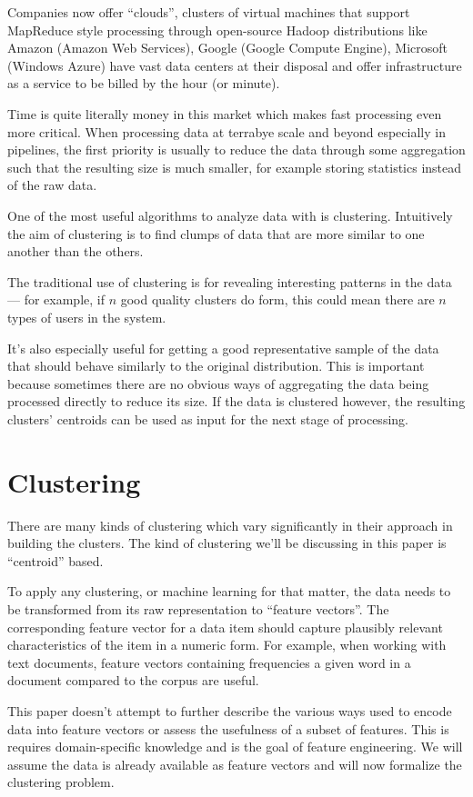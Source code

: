 \documentclass{article}
\begin{document}
Companies now offer ``clouds'', clusters of virtual machines that support
MapReduce style processing through open-source Hadoop distributions like Amazon
(Amazon Web Services), Google (Google Compute Engine), Microsoft (Windows
Azure) have vast data centers at their disposal and offer infrastructure as a
service to be billed by the hour (or minute).

Time is quite literally money in this market which makes fast processing even
more critical. When processing data at terrabye scale and beyond especially in
pipelines, the first priority is usually to reduce the data through some
aggregation such that the resulting size is much smaller, for example storing
statistics instead of the raw data.

One of the most useful algorithms to analyze data with is clustering.
Intuitively the aim of clustering is to find clumps of data that are more
similar to one another than the others.

The traditional use of clustering is for revealing interesting patterns in the
data --- for example, if $n$ good quality clusters do form, this could mean there
are $n$ types of users in the system.

It's also especially useful for getting a good representative sample of the data
that should behave similarly to the original distribution.
This is important because sometimes there are no obvious ways of aggregating the 
data being processed directly to reduce its size. If the data is clustered
however, the resulting clusters' centroids can be used as input for the next
stage of processing.

\section{Clustering}

There are many kinds of clustering which vary significantly in their approach
in building the clusters. The kind of clustering we'll be discussing in this
paper is ``centroid'' based.

To apply any clustering, or machine learning for that matter, the data needs to
be transformed from its raw representation to ``feature vectors''. The
corresponding feature vector for a data item should capture plausibly relevant
characteristics of the item in a numeric form.
For example, when working with text documents, feature vectors containing
frequencies a given word in a document compared to the corpus are useful.

This paper doesn't attempt to further describe the various ways used to encode
data into feature vectors or assess the usefulness of a subset of features.
This is requires domain-specific knowledge and is the goal of feature engineering.
We will assume the data is already available as feature vectors and will now
formalize the clustering problem.
\end{document}
